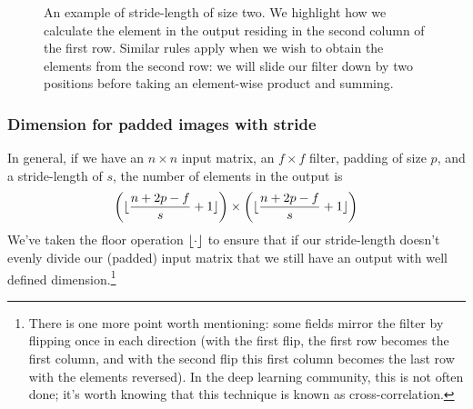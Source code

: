 \documentclass[12pt]{article}
\begin{document}
\begin{figure}[h]
  \caption{\footnotesize An example of stride-length of size two. We highlight how we calculate the element in the output residing
in the second column of the first row. Similar rules apply when we wish to obtain the elements from the second row: we will slide our filter down by two positions
before taking an element-wise product and summing.}
\end{figure}

\subsubsection{Dimension for padded images with stride}
In general, if we have an $n \times n$ input matrix, an $f \times f$ filter, padding of size $p$, and a stride-length of $s$,
the number of elements in the output is
\begin{equation*}   \left(\lfloor\frac{n + 2p - f}{s} + 1\rfloor\right) \times \left(\lfloor\frac{n + 2p - f}{s} + 1\rfloor\right) \end{equation*}
We've taken the floor operation $\lfloor\cdot\rfloor$ to ensure that if our stride-length doesn't evenly divide
our (padded) input matrix that we still have an output with well defined dimension.\footnote{
There is one more point worth mentioning: some fields mirror the filter by flipping once in each direction (with the first flip, the first row becomes the first column, and with the second flip this first column becomes the last row with the elements reversed). In the deep learning community, this is not often done; it's worth knowing that this technique is
known as cross-correlation.}
\end{document}
